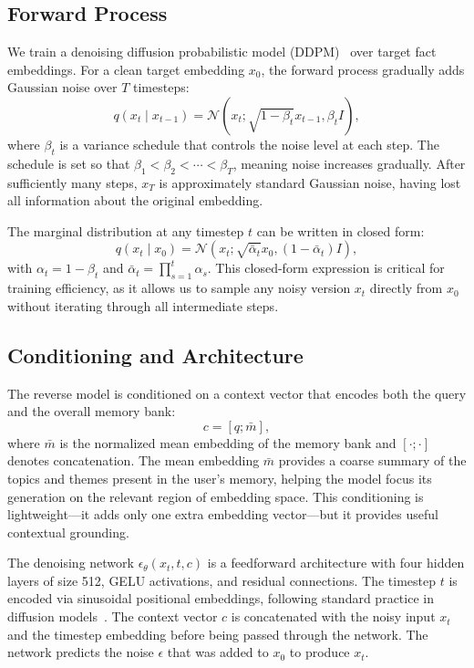 \documentclass{article}
\begin{document}
\subsection{Forward Process}

We train a denoising diffusion probabilistic model (DDPM)~\cite{ho2020ddpm} over target fact embeddings. For a clean target embedding $x_0$, the forward process gradually adds Gaussian noise over $T$ timesteps:
\begin{equation}
  q(x_t \mid x_{t-1}) =
  \mathcal{N}\left(x_t; \sqrt{1-\beta_t}x_{t-1}, \beta_t I\right),
\end{equation}
where $\beta_t$ is a variance schedule that controls the noise level at each step. The schedule is set so that $\beta_1 < \beta_2 < \cdots < \beta_T$, meaning noise increases gradually. After sufficiently many steps, $x_T$ is approximately standard Gaussian noise, having lost all information about the original embedding.

The marginal distribution at any timestep $t$ can be written in closed form:
\begin{equation}
  q(x_t \mid x_0) =
  \mathcal{N}\left(x_t; \sqrt{\bar{\alpha}_t}x_0, (1-\bar{\alpha}_t)I\right),
\end{equation}
with $\alpha_t=1-\beta_t$ and $\bar{\alpha}_t=\prod_{s=1}^{t}\alpha_s$. This closed-form expression is critical for training efficiency, as it allows us to sample any noisy version $x_t$ directly from $x_0$ without iterating through all intermediate steps.

\subsection{Conditioning and Architecture}

The reverse model is conditioned on a context vector that encodes both the query and the overall memory bank:
\begin{equation}
  c = [q; \bar{m}],
\end{equation}
where $\bar{m}$ is the normalized mean embedding of the memory bank and $[\cdot;\cdot]$ denotes concatenation. The mean embedding $\bar{m}$ provides a coarse summary of the topics and themes present in the user's memory, helping the model focus its generation on the relevant region of embedding space. This conditioning is lightweight---it adds only one extra embedding vector---but it provides useful contextual grounding.

The denoising network $\epsilon_\theta(x_t, t, c)$ is a feedforward architecture with four hidden layers of size 512, GELU activations, and residual connections. The timestep $t$ is encoded via sinusoidal positional embeddings, following standard practice in diffusion models~\cite{ho2020ddpm}. The context vector $c$ is concatenated with the noisy input $x_t$ and the timestep embedding before being passed through the network. The network predicts the noise $\epsilon$ that was added to $x_0$ to produce $x_t$.
\end{document}
